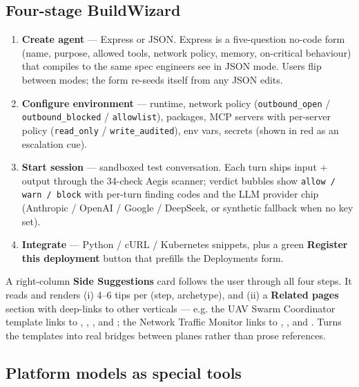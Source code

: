 \documentclass[11pt,a4paper]{article}
\begin{document}
\subsection{Four-stage BuildWizard}

\begin{enumerate}
\item \textbf{Create agent} --- Express or JSON. Express is a
      five-question no-code form (name, purpose, allowed tools, network
      policy, memory, on-critical behaviour) that compiles to the same
      spec engineers see in JSON mode. Users flip between modes; the
      form re-seeds itself from any JSON edits.
\item \textbf{Configure environment} --- runtime, network policy
      (\texttt{outbound\_open} / \texttt{outbound\_blocked} /
      \texttt{allowlist}), packages, MCP servers with per-server policy
      (\texttt{read\_only} / \texttt{write\_audited}), env vars,
      secrets (shown in red as an escalation cue).
\item \textbf{Start session} --- sandboxed test conversation. Each
      turn ships input + output through the 34-check Aegis scanner;
      verdict bubbles show \texttt{allow / warn / block} with per-turn
      finding codes and the LLM provider chip (Anthropic / OpenAI /
      Google / DeepSeek, or synthetic fallback when no key set).
\item \textbf{Integrate} --- Python / cURL / Kubernetes snippets, plus
      a green \textbf{Register this deployment} button that prefills
      the Deployments form.
\end{enumerate}

A right-column \textbf{Side Suggestions} card follows the user through
all four steps. It reads
 and
renders (i) 4--6 tips per (step, archetype), and (ii) a
\textbf{Related pages} section with deep-links to other verticals ---
e.g. the UAV Swarm Coordinator template links to
, , ,
and ; the Network Traffic Monitor links to
, , and .
Turns the templates into real bridges between planes rather than
prose references.

\subsection{Platform models as special tools}
\end{document}

